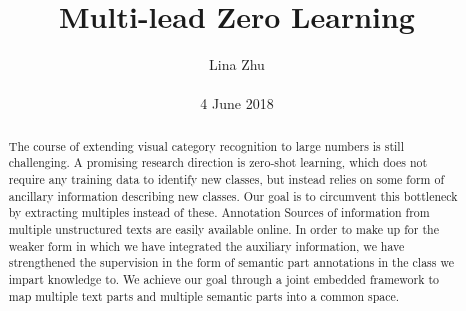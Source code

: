 \documentclass[10pt,twocolumn,letterpaper]{article}
\title{\textbf{Multi-lead Zero Learning}}
\author{Lina Zhu\\\\4  June 2018}
\begin{document}

\maketitle
\begin{abstract}
The course of extending visual category recognition to large numbers is still challenging. A promising research direction is zero-shot learning, which does not require any training data to identify new classes, but instead relies on some form of ancillary information describing new classes. Our goal is to circumvent this bottleneck by extracting multiples instead of these. Annotation Sources of information from multiple unstructured texts are easily available online. In order to make up for the weaker form in which we have integrated the auxiliary information, we have strengthened the supervision in the form of semantic part annotations in the class we impart knowledge to. We achieve our goal through a joint embedded framework to map multiple text parts and multiple semantic parts into a common space.
\end{abstract}
\end{document}
